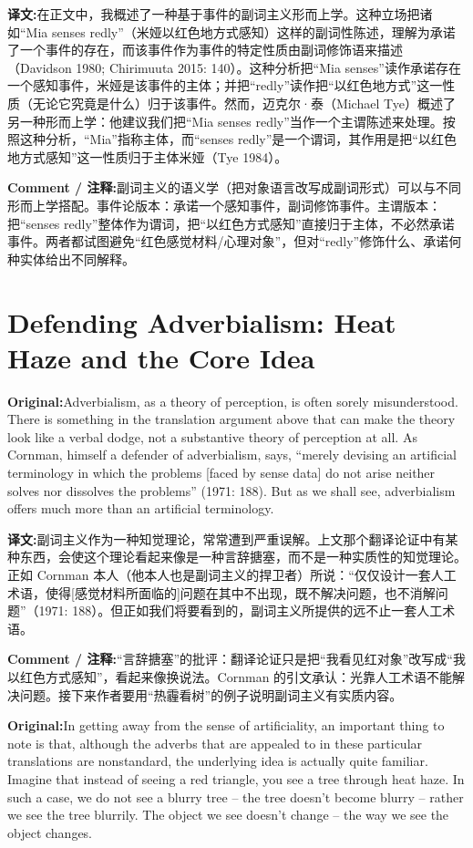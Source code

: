 \documentclass[11pt,a4paper]{article}
\newcommand{\eng}[1]{\begin{engbox}\noindent\textbf{Original:}\quad #1\end{engbox}}
\newcommand{\cn}[1]{\begin{cnbox}\noindent\textbf{译文:}\quad #1\end{cnbox}}
\newcommand{\cmt}[1]{\begin{commentbox}\noindent\textbf{Comment / 注释:}\quad #1\end{commentbox}}
\begin{document}
\cn{在正文中，我概述了一种基于事件的副词主义形而上学。这种立场把诸如“Mia senses redly”（米娅以红色地方式感知）这样的副词性陈述，理解为承诺了一个事件的存在，而该事件作为事件的特定性质由副词修饰语来描述（Davidson 1980; Chirimuuta 2015: 140）。这种分析把“Mia senses”读作承诺存在一个感知事件，米娅是该事件的主体；并把“redly”读作把“以红色地方式”这一性质（无论它究竟是什么）归于该事件。然而，迈克尔·泰（Michael Tye）概述了另一种形而上学：他建议我们把“Mia senses redly”当作一个主谓陈述来处理。按照这种分析，“Mia”指称主体，而“senses redly”是一个谓词，其作用是把“以红色地方式感知”这一性质归于主体米娅（Tye 1984）。}

\cmt{副词主义的语义学（把对象语言改写成副词形式）可以与不同形而上学搭配。事件论版本：承诺一个感知事件，副词修饰事件。主谓版本：把“senses redly”整体作为谓词，把“以红色方式感知”直接归于主体，不必然承诺事件。两者都试图避免“红色感觉材料/心理对象”，但对“redly”修饰什么、承诺何种实体给出不同解释。}

\section{Defending Adverbialism: Heat Haze and the Core Idea}

\eng{Adverbialism, as a theory of perception, is often sorely misunderstood. There is something in the translation argument above that can make the theory look like a verbal dodge, not a substantive theory of perception at all. As Cornman, himself a defender of adverbialism, says, “merely devising an artificial terminology in which the problems [faced by sense data] do not arise neither solves nor dissolves the problems” (1971: 188). But as we shall see, adverbialism offers much more than an artificial terminology.}

\cn{副词主义作为一种知觉理论，常常遭到严重误解。上文那个翻译论证中有某种东西，会使这个理论看起来像是一种言辞搪塞，而不是一种实质性的知觉理论。正如 Cornman 本人（他本人也是副词主义的捍卫者）所说：“仅仅设计一套人工术语，使得[感觉材料所面临的]问题在其中不出现，既不解决问题，也不消解问题”（1971: 188）。但正如我们将要看到的，副词主义所提供的远不止一套人工术语。}

\cmt{“言辞搪塞”的批评：翻译论证只是把“我看见红对象”改写成“我以红色方式感知”，看起来像换说法。Cornman 的引文承认：光靠人工术语不能解决问题。接下来作者要用“热霾看树”的例子说明副词主义有实质内容。}

\eng{In getting away from the sense of artificiality, an important thing to note is that, although the adverbs that are appealed to in these particular translations are nonstandard, the underlying idea is actually quite familiar. Imagine that instead of seeing a red triangle, you see a tree through heat haze. In such a case, we do not see a blurry tree – the tree doesn’t become blurry – rather we see the tree blurrily. The object we see doesn’t change – the way we see the object changes.}
\end{document}
